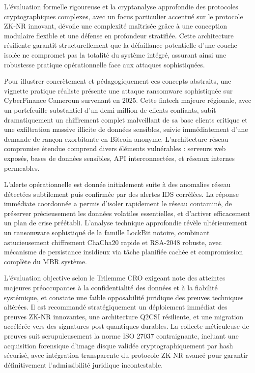 \documentclass[12pt, a4paper]{article}
\begin{document}
	L'évaluation formelle rigoureuse et la cryptanalyse approfondie des protocoles cryptographiques complexes, avec un focus particulier accentué sur le protocole ZK-NR innovant, dévoile une complexité maîtrisée grâce à une conception modulaire flexible et une défense en profondeur stratifiée. Cette architecture résiliente garantit structurellement que la défaillance potentielle d'une couche isolée ne compromet pas la totalité du système intégré, assurant ainsi une robustesse pratique opérationnelle face aux attaques sophistiquées.
	
	\medskip
	Pour illustrer concrètement et pédagogiquement ces concepts abstraits, une vignette pratique réaliste présente une attaque ransomware sophistiquée sur CyberFinance Cameroun survenant en 2025. Cette fintech majeure régionale, avec un portefeuille substantiel d'un demi-million de clients confiants, subit dramatiquement un chiffrement complet malveillant de sa base clients critique et une exfiltration massive illicite de données sensibles, suivie immédiatement d'une demande de rançon exorbitante en Bitcoin anonyme. L'architecture réseau compromise étendue comprend divers éléments vulnérables : serveurs web exposés, bases de données sensibles, API interconnectées, et réseaux internes permeables.
	
	L'alerte opérationnelle est donnée initialement suite à des anomalies réseau détectées subtilement puis confirmée par des alertes IDS corrélées. La réponse immédiate coordonnée a permis d'isoler rapidement le réseau contaminé, de préserver précieusement les données volatiles essentielles, et d'activer efficacement un plan de crise préétabli. L'analyse technique approfondie révèle ultérieurement un ransomware sophistiqué de la famille LockBit notoire, combinant astucieusement chiffrement ChaCha20 rapide et RSA-2048 robuste, avec mécanisme de persistance insidieux via tâche planifiée cachée et compromission complète du MBR système.
	
	L'évaluation objective selon le Trilemme CRO exigeant note des atteintes majeures préoccupantes à la confidentialité des données et à la fiabilité systémique, et constate une faible opposabilité juridique des preuves techniques altérées. Il est recommandé stratégiquement un déploiement immédiat des preuves ZK-NR innovantes, une architecture Q2CSI résiliente, et une migration accélérée vers des signatures post-quantiques durables. La collecte méticuleuse de preuves suit scrupuleusement la norme ISO 27037 contraignante, incluant une acquisition forensique d'image disque validée cryptographiquement par hash sécurisé, avec intégration transparente du protocole ZK-NR avancé pour garantir définitivement l'admissibilité juridique incontestable.
	
\end{document}
